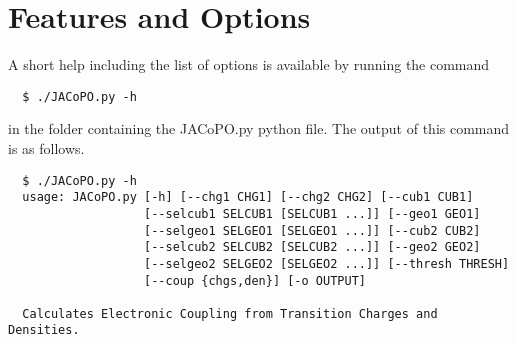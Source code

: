 \documentclass[a4paper]{article}
\begin{document}
\section*{Features and Options}
A short help including the list of options is available by running the command

\begin{verbatim}
  $ ./JACoPO.py -h
\end{verbatim}

in the folder containing the JACoPO.py python file. The output of this command is as follows.

\begin{verbatim}
  $ ./JACoPO.py -h
  usage: JACoPO.py [-h] [--chg1 CHG1] [--chg2 CHG2] [--cub1 CUB1]
                   [--selcub1 SELCUB1 [SELCUB1 ...]] [--geo1 GEO1]
                   [--selgeo1 SELGEO1 [SELGEO1 ...]] [--cub2 CUB2]
                   [--selcub2 SELCUB2 [SELCUB2 ...]] [--geo2 GEO2]
                   [--selgeo2 SELGEO2 [SELGEO2 ...]] [--thresh THRESH]
                   [--coup {chgs,den}] [-o OUTPUT]
  
  Calculates Electronic Coupling from Transition Charges and Densities.
  

\end{verbatim}
\end{document}
